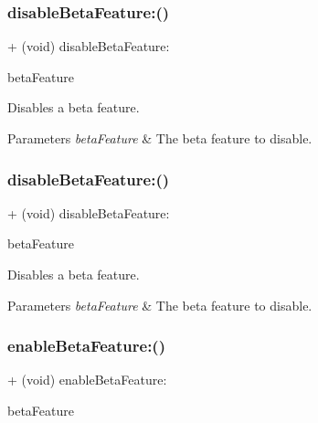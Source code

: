 \subsubsection{\texorpdfstring{disable\+Beta\+Feature\+:()}{disableBetaFeature:()}\hspace{0.1cm}{\footnotesize\ttfamily [4/5]}}
{\footnotesize\ttfamily + (void) disable\+Beta\+Feature\+: \begin{DoxyParamCaption}\item[{(F\+B\+Beta\+Features)}]{beta\+Feature }\end{DoxyParamCaption}}

Disables a beta feature.


\begin{DoxyParams}{Parameters}
{\em beta\+Feature} & The beta feature to disable. \\
\hline
\end{DoxyParams}
\mbox{\label{interfaceFBSettings_a6cc67de9d4b0069de4bfc6a3872f7114}} 
\subsubsection{\texorpdfstring{disable\+Beta\+Feature\+:()}{disableBetaFeature:()}\hspace{0.1cm}{\footnotesize\ttfamily [5/5]}}
{\footnotesize\ttfamily + (void) disable\+Beta\+Feature\+: \begin{DoxyParamCaption}\item[{(F\+B\+Beta\+Features)}]{beta\+Feature }\end{DoxyParamCaption}}

Disables a beta feature.


\begin{DoxyParams}{Parameters}
{\em beta\+Feature} & The beta feature to disable. \\
\hline
\end{DoxyParams}
\mbox{\label{interfaceFBSettings_a390b436e1de87f3d49979a6aa98e14b1}} 
\subsubsection{\texorpdfstring{enable\+Beta\+Feature\+:()}{enableBetaFeature:()}\hspace{0.1cm}{\footnotesize\ttfamily [1/5]}}
{\footnotesize\ttfamily + (void) enable\+Beta\+Feature\+: \begin{DoxyParamCaption}\item[{(F\+B\+Beta\+Features)}]{beta\+Feature }\end{DoxyParamCaption}}

